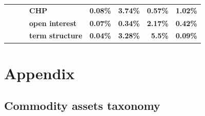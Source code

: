 \documentclass[
  authoryear,
  preprint,
  3p]{elsarticle}
\begin{document}
\begin{longtable}[t]{>{}l>{}l>{}l>{}l>{}r>{}r>{}r>{}r}
\textbf{} & \textbf{} & \textbf{} & \textbf{CHP} & \textcolor[HTML]{4285f4}{\textbf{0.08\%}} & \textcolor[HTML]{4285f4}{\textbf{3.74\%}} & \textcolor[HTML]{4285f4}{\textbf{0.57\%}} & \textcolor[HTML]{4285f4}{\textbf{1.02\%}}\\
\addlinespace
\textbf{} & \textbf{} & \textbf{} & \textbf{open interest} & \textcolor[HTML]{4285f4}{\textbf{0.07\%}} & \textcolor[HTML]{4285f4}{\textbf{0.34\%}} & \textcolor[HTML]{4285f4}{\textbf{2.17\%}} & \textcolor[HTML]{4285f4}{\textbf{0.42\%}}\\
\textbf{} & \textbf{} & \textbf{} & \textbf{term structure} & \textcolor[HTML]{4285f4}{\textbf{0.04\%}} & \textcolor[HTML]{4285f4}{\textbf{3.28\%}} & \textcolor[HTML]{4285f4}{\textbf{5.5\%}} & \textcolor[HTML]{4285f4}{\textbf{0.09\%}}\\
\bottomrule

\end{longtable}

\endgroup{}

\newpage

\section*{Appendix}\label{appendix}

\subsection{Commodity assets taxonomy}\label{sec-taxonomy}

\begingroup\fontsize{7}{9}\selectfont
\end{document}
